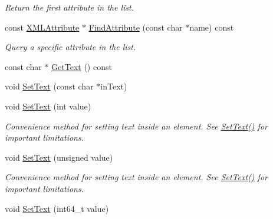 \begin{DoxyCompactItemize}
\begin{DoxyCompactList}\small\item\em Return the first attribute in the list. \end{DoxyCompactList}\item 
const \hyperlink{classtinyxml2_1_1XMLAttribute}{X\+M\+L\+Attribute} $\ast$ \hyperlink{classtinyxml2_1_1XMLElement_aaf46b0799ea419e5d070ac9a357de48f}{Find\+Attribute} (const char $\ast$name) const \hypertarget{classtinyxml2_1_1XMLElement_aaf46b0799ea419e5d070ac9a357de48f}{}\label{classtinyxml2_1_1XMLElement_aaf46b0799ea419e5d070ac9a357de48f}

\begin{DoxyCompactList}\small\item\em Query a specific attribute in the list. \end{DoxyCompactList}\item 
const char $\ast$ \hyperlink{classtinyxml2_1_1XMLElement_a56cc727044dad002b978256754d43a4b}{Get\+Text} () const 
\item 
void \hyperlink{classtinyxml2_1_1XMLElement_a1f9c2cd61b72af5ae708d37b7ad283ce}{Set\+Text} (const char $\ast$in\+Text)
\item 
void \hyperlink{classtinyxml2_1_1XMLElement_aeae8917b5ea6060b3c08d4e3d8d632d7}{Set\+Text} (int value)\hypertarget{classtinyxml2_1_1XMLElement_aeae8917b5ea6060b3c08d4e3d8d632d7}{}\label{classtinyxml2_1_1XMLElement_aeae8917b5ea6060b3c08d4e3d8d632d7}

\begin{DoxyCompactList}\small\item\em Convenience method for setting text inside an element. See \hyperlink{classtinyxml2_1_1XMLElement_a1f9c2cd61b72af5ae708d37b7ad283ce}{Set\+Text()} for important limitations. \end{DoxyCompactList}\item 
void \hyperlink{classtinyxml2_1_1XMLElement_a7bbfcc11d516598bc924a8fba4d08597}{Set\+Text} (unsigned value)\hypertarget{classtinyxml2_1_1XMLElement_a7bbfcc11d516598bc924a8fba4d08597}{}\label{classtinyxml2_1_1XMLElement_a7bbfcc11d516598bc924a8fba4d08597}

\begin{DoxyCompactList}\small\item\em Convenience method for setting text inside an element. See \hyperlink{classtinyxml2_1_1XMLElement_a1f9c2cd61b72af5ae708d37b7ad283ce}{Set\+Text()} for important limitations. \end{DoxyCompactList}\item 
void \hyperlink{classtinyxml2_1_1XMLElement_a7b62cd33acdfeff7ea2b1b330d4368e4}{Set\+Text} (int64\+\_\+t value)\hypertarget{classtinyxml2_1_1XMLElement_a7b62cd33acdfeff7ea2b1b330d4368e4}{}\label{classtinyxml2_1_1XMLElement_a7b62cd33acdfeff7ea2b1b330d4368e4}


\end{DoxyCompactItemize}
